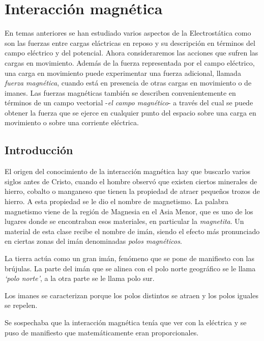 \chapter{Interacción magnética}

\begin{miparrafo}
En temas anteriores se han estudiado varios aspectos de la Electrostática como son las fuerzas entre cargas eláctricas en reposo y su descripción en términos del campo eléctrico y del potencial. Ahora consideraremos las acciones que sufren las cargas en movimiento. Además de la fuerza representada por el campo eléctrico, una carga en movimiento puede experimentar una fuerza adicional, llamada \emph{fuerza magnética}, cuando está en presencia de otras cargas en movimiento o de imanes. Las fuerzas magnéticas también se describen convenientemente en términos de un campo vectorial -\emph{el campo magnético}- a través del cual se puede obtener la fuerza que se ejerce en cualquier punto del espacio sobre una carga en movimiento o sobre una corriente eléctrica.
\end{miparrafo}

\section{Introducción}

El origen del conocimiento de la interacción magnética hay que buscarlo varios siglos antes de Cristo, cuando el hombre observó que existen ciertos minerales de hierro, cobalto o manganeso que tienen la propiedad de atraer pequeños trozos de hierro. A esta propiedad se le dio el nombre de magnetismo. La palabra magnetismo viene de la región de Magnesia en el Asia Menor, que es uno de los lugares donde se encontraban esos materiales, en particular la \emph{magnetita}. Un material de esta clase recibe el nombre de imán, siendo el efecto más pronunciado en ciertas zonas del imán denominadas \emph{polos magnéticos}. 

La tierra actúa como un gran imán, fenómeno que se pone de manifiesto con las brújulas. La parte del imán que se alinea con el polo norte geográfico se le llama \emph{`polo norte'}, a la otra parte se le llama polo sur.

Los imanes se caracterizan porque los polos distintos se atraen y los polos iguales se repelen.

Se sospechaba que la interacción magnética tenía que ver con la eléctrica y se puso de manifiesto que matemáticamente eran proporcionales.

